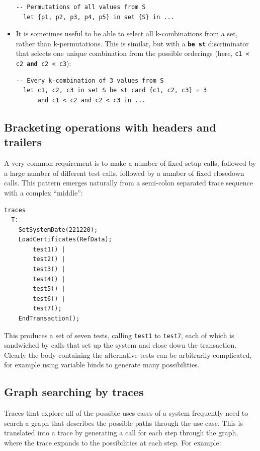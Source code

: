 \documentclass{overturerepchap}
\begin{document}
\begin{itemize}
\begin{lstlisting}
-- Permutations of all values from S
  let {p1, p2, p3, p4, p5} in set {S} in ...
\end{lstlisting}
\normalsize
  \item It is sometimes useful to be able to select all k-combinations from
  a set, rather than k-permutations. This is similar, but with a \texttt{\textbf{be
  st}} discriminator that selects one unique combination from the possible orderings
  (here, \texttt{c1 < c2 \textbf{and} c2 < c3}):
\small
\begin{lstlisting}
-- Every k-combination of 3 values from S
  let c1, c2, c3 in set S be st card {c1, c2, c3} = 3
      and c1 < c2 and c2 < c3 in ...
\end{lstlisting}
\normalsize
\end{itemize}

\subsection{Bracketing operations with headers and trailers}

A very common requirement is to make a number of fixed setup calls,
followed by a large number of different test calls, followed by a number of
fixed closedown calls. This pattern emerges naturally from a semi-colon
separated trace sequence with a complex ``middle'':
\scriptsize
\begin{lstlisting}
traces
  T:
    SetSystemDate(221220);
    LoadCertificates(RefData);
        test1() |
        test2() |
        test3() |
        test4() |
        test5() |
        test6() |
        test7();
    EndTransaction();
\end{lstlisting}
\normalsize

\noindent This produces a set of seven tests, calling \texttt{test1} to \texttt{test7},
each of which is sandwiched by calls that set up the system and close down the
transaction. Clearly the body containing the alternative tests can be
arbitrarily complicated, for example using variable binds to generate many
possibilities.

\subsection{Graph searching by traces}

Traces that explore all of the possible uses cases of a system frequently
need to search a graph that describes the possible paths through the use case.
This is translated into a trace by generating a call for each step through the
graph, where the trace expands to the possibilities at each step. For example:
\end{document}
